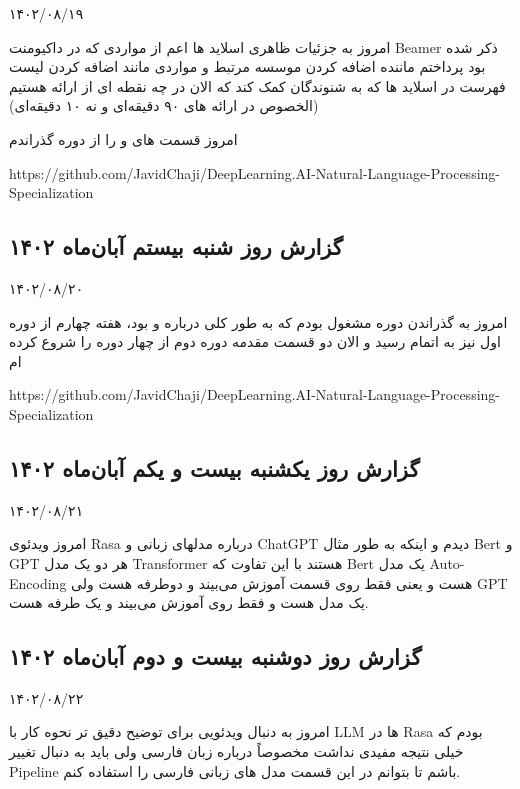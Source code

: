 ۱۴۰۲/۰۸/۱۹

امروز به جزئیات ظاهری اسلاید ها اعم از مواردی که در داکیومنت Beamer ذکر شده بود پرداختم ماننده اضافه کردن موسسه مرتبط و مواردی مانند اضافه کردن لیست فهرست در اسلاید ها که به شنوندگان کمک کند که الان در چه نقطه ای از ارائه هستیم (الخصوص در ارائه های ۹۰ دقیقه‌ای و نه ۱۰ دقیقه‌ای)

امروز قسمت های  و  را از دوره  گذراندم

https://github.com/JavidChaji/DeepLearning.AI-Natural-Language-Processing-Specialization


\subsection{گزارش روز شنبه بیستم آبان‌ماه ۱۴۰۲}

۱۴۰۲/۰۸/۲۰

امروز به گذراندن دوره  مشغول بودم که به طور کلی درباره  و  بود، هفته چهارم از دوره اول نیز به اتمام رسید و الان دو قسمت مقدمه دوره دوم از چهار دوره  را شروع کرده ام

https://github.com/JavidChaji/DeepLearning.AI-Natural-Language-Processing-Specialization


\subsection{گزارش روز یکشنبه بیست و یکم آبان‌ماه ۱۴۰۲}

۱۴۰۲/۰۸/۲۱

امروز ویدئوی Rasa درباره مدلهای زبانی و ChatGPT دیدم و اینکه به طور مثال Bert و GPT هر دو یک مدل Transformer هستند با این تفاوت که Bert یک مدل Auto-Encoding هست و یعنی فقط روی قسمت  آموزش می‌بیند و دوطرفه هست ولی GPT یک مدل  هست و فقط روی  آموزش می‌بیند و یک طرفه هست.


\subsection{گزارش روز دوشنبه بیست و دوم آبان‌ماه ۱۴۰۲}

۱۴۰۲/۰۸/۲۲

امروز به دنبال ویدئویی برای توضیح دقیق تر نحوه کار با LLM ها در Rasa بودم که خیلی نتیجه مفیدی نداشت مخصوصاً درباره زبان فارسی ولی باید به دنبال تغییر Pipeline باشم تا بتوانم در این قسمت مدل های زبانی فارسی را استفاده کنم.


